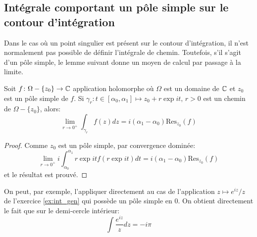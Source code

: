\subsection{Intégrale comportant un pôle simple sur le contour d'intégration}
Dans le cas où un point singulier est présent sur le contour d'intégration, il n'est normalement pas possible de définir l'intégrale de chemin. Toutefois, s'il s'agit d'un pôle simple, le lemme suivant donne un moyen de calcul par passage à la limite.
\begin{lemma}
Soit $f \colon \Omega-\{z_0\} \to \mathbb{C}$ application holomorphe où $\Omega$ est un domaine de $\mathbb{C}$ et $z_0$ est un pôle simple de $f.$ Si $\gamma_r \colon t \in [\alpha_0, \alpha_1] \mapsto z_0 + r \exp i t, \, r > 0$ est un chemin de $\Omega-\{z_0\}$, alors:
\[
\lim_{r \to 0^+}\int_{\gamma_r} f(z) dz = i \left( \alpha_1 - \alpha_0\right) \text{Res}_{z_0} (f)
 \]
\end{lemma}
\begin{proof}
    Comme $z_0$ est un pôle simple, par convergence dominée:
    \[
\lim_{r \to 0^+} i \int_{\alpha_0}^{\alpha_1} r \exp{it} f(r\exp it) dt =
i \left(\alpha_1 - \alpha_0\right) \text{Res}_{z_0} (f)
    \]
    et le résultat est prouvé.
    \end{proof}
On peut, par exemple, l'appliquer directement au cas de l'application $z \mapsto e^{iz} / z$ de l'exercice \ref{ex:int_gen} qui possède un pôle simple en $0$. On obtient directement le fait que sur le demi-cercle intérieur:
\[
\int \frac{e^{iz}}{z} dz =  - i \pi
\]

